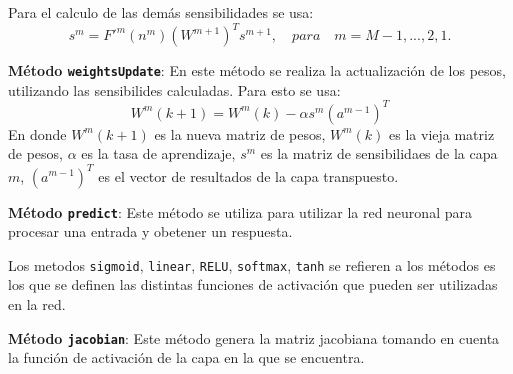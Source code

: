 \documentclass{article}
\begin{document}
Para el calculo de las demás sensibilidades se usa:
\begin{equation}
    s^m = F'^m(n^m)(W^{m+1})^Ts^{m+1}, \hspace{1em} para \hspace{1em} m = M-1, ..., 2,1.
\end{equation}

\textbf{Método \texttt{weightsUpdate}}: En este método se realiza la actualización de los pesos, utilizando las sensibilides calculadas. Para esto se usa:
\begin{equation}
    W^m(k+1) = W^m(k) - \alpha s^m(a^{m-1})^T
\end{equation}
En donde $W^m(k+1)$ es la nueva matriz de pesos, $W^m(k)$ es la vieja matriz de pesos, $\alpha$ es la tasa de aprendizaje, $s^m$ es la matriz de sensibilidaes de la capa $m$,
$(a^{m-1})^T$ es el vector de resultados de la capa transpuesto. 

\textbf{Método \texttt{predict}}: Este método se utiliza para utilizar la red neuronal para procesar una entrada y obetener un respuesta. 

Los metodos \texttt{sigmoid}, \texttt{linear}, \texttt{RELU}, \texttt{softmax}, \texttt{tanh} se refieren a los métodos es los que se definen las distintas funciones de activación que pueden ser 
utilizadas en la red.

\textbf{Método \texttt{jacobian}}: Este método genera la matriz jacobiana tomando en cuenta la función de activación de la capa en la que se encuentra. 
\end{document}
